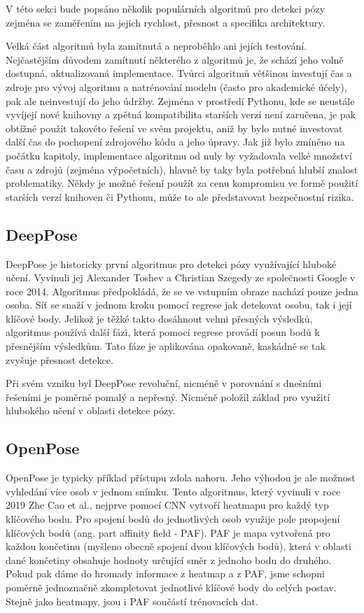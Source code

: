 V této sekci bude popsáno několik populárních algoritmů pro detekci pózy
zejména se zaměřením na jejich rychlost, přesnost a specifika architektury.

Velká část algoritmů byla zamítnutá a neproběhlo ani jejích testování.
Nejčastějším důvodem zamítnutí některého z algoritmů je, že schází jeho volně
dostupná, aktualizovaná implementace. Tvůrci algoritmů většinou investují čas a
zdroje pro vývoj algoritmu a natrénování modelu (často pro akademické účely),
pak ale neinvestují do jeho údržby. Zejména v prostředí Pythonu, kde se
neustále vyvíjejí nové knihovny a zpětná kompatibilita starších verzí není
zaručena, je pak obtížné použít takovéto řešení ve svém projektu, aniž by bylo
nutné investovat další čas do pochopení zdrojového kódu a jeho úpravy. Jak již
bylo zmíněno na počátku kapitoly, implementace algoritmu od nuly by vyžadovala
velké množství času a zdrojů (zejména výpočetních), hlavně by taky byla
potřebná hlubší znalost problematiky. Někdy je možné řešení použít za cenu
kompromisu ve formě použití starších verzí knihoven či Pythonu, může to ale
představovat bezpečnostní rizika.

\subsection{DeepPose}
DeepPose je historicky první algoritmus pro detekci pózy využívající hluboké
učení. Vyvinuli jej Alexander Toshev a Christian Szegedy ze společnosti Google
v roce 2014. \cite{deeppose} Algoritmus předpokládá, že se ve vstupním obraze
nachází pouze jedna osoba. Síť se snaží v jednom kroku pomocí regrese jak
detekovat osobu, tak i její klíčové body. Jelikož je těžké takto dosáhnout
velmi přesných výsledků, algoritmus používá další fázi, která pomocí regrese
provádí posun bodů k přesnějším výsledkům. Tato fáze je aplikována opakovaně,
kaskádně se tak zvyšuje přesnost detekce.

Při svém vzniku byl DeepPose revoluční, nicméně v porovnání s dnešními řešeními
je poměrně pomalý a nepřesný. Nicméně položil základ pro využití hlubokého
učení v oblasti detekce pózy.

\subsection{OpenPose}

OpenPose \cite{openpose} je typicky příklad přístupu zdola nahoru. Jeho výhodou
je ale možnost vyhledání více osob v jednom snímku. Tento algoritmus, který
vyvinuli v roce 2019 Zhe Cao et al., nejprve pomocí CNN vytvoří heatmapu pro
každý typ klíčového bodu. Pro spojení bodů do jednotlivých osob využije pole
propojení klíčových bodů (ang. part affinity field - PAF). PAF je mapa
vytvořená pro každou končetinu (myšleno obecně spojení dvou klíčových bodů),
která v oblasti dané končetiny obsahuje hodnoty určující směr z jednoho bodu do
druhého. Pokud pak dáme do hromady informace z heatmap a z PAF, jsme schopni
poměrně jednoznačně zkompletovat jednotlivé klíčové body do celých postav.
Stejně jako heatmapy, jsou i PAF součástí trénovacích dat.

